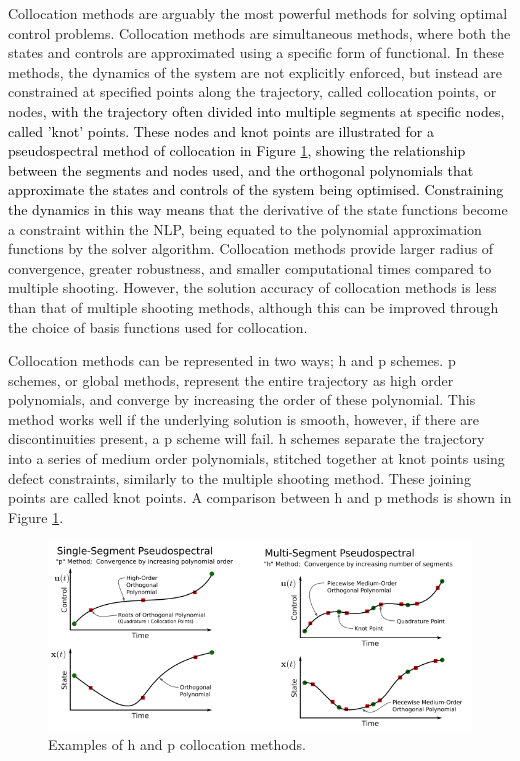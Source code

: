 Collocation methods are arguably the most powerful methods for solving optimal control problems\cite{Rao2009}. Collocation methods are simultaneous methods, where both the states and controls are approximated using a specific form of functional\cite{Kelly2015,Rao2009}. In these methods, the dynamics of the system are not explicitly enforced, but instead are constrained at specified points along the trajectory, called collocation points, or nodes\cite{Kelly2015}\textcolor{black}{, with the trajectory often divided into multiple segments at specific nodes, called 'knot' points. These nodes and knot points are illustrated for a pseudospectral method of collocation in Figure \ref{fig:HPExamples}, showing the relationship between the segments and nodes used, and the orthogonal polynomials that approximate the states and controls of the system being optimised. Constraining the dynamics in this way means} that the derivative of the state functions become a constraint within the NLP, being equated to the polynomial approximation functions by the solver algorithm. 
Collocation methods provide larger radius of convergence, greater robustness, and smaller computational times compared to multiple shooting\cite{Fasano2013}. However, the solution accuracy of collocation methods is less than that of multiple shooting methods\cite{Fasano2013}, although this can be improved through the choice of basis functions used for collocation\cite{Rao2009}.

Collocation methods can be represented in two ways; \textsf{h} and \textsf{p} schemes\cite{Kelly2015}. \textsf{p} schemes, or global methods, represent the entire trajectory as high order polynomials, and converge by increasing the order of these polynomial\cite{Kelly2015}. This method works well if the underlying solution is smooth, however, if there are discontinuities present, a \textsf{p} scheme will fail\cite{Kelly2015}. \textsf{h} schemes separate the trajectory into a series of medium order polynomials, stitched together at knot points using defect constraints, similarly to the multiple shooting method\cite{Kelly2015,Rao2009,Ross2004}. These joining points are called knot points\cite{Kelly2015,Ross2004}. A comparison between \textsf{h} and \textsf{p} methods is shown in Figure \ref{fig:HPExamples}.

\begin{figure}[ht]
	\centering
	\includegraphics[width=0.9\linewidth]{figures/2_literature-review/HPExamples}
	\caption{Examples of \textsf{h} and \textsf{p} collocation methods\cite{Kelly2015}.}
	\label{fig:HPExamples}
\end{figure}

